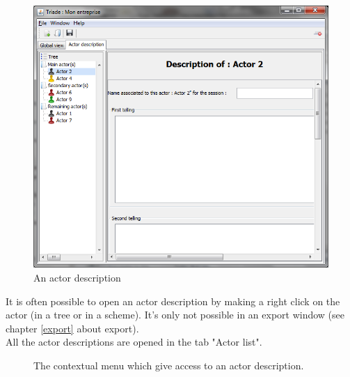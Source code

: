 \begin{figure}[h!t]
\centering

\includegraphics[width=12cm]{images/fiche_acteur.png}

\caption{An actor description}

\end{figure}
It is often possible to open an actor description by making a right click on the actor (in a tree or in a scheme). It's only not possible in an export window (see chapter \ref{export} about export).\\

All the actor descriptions are opened in the tab "Actor list".\\


\begin{figure}[h!t]
\centering
{}

\caption{The contextual menu which give access to an actor description.}

\label{menu_fiche_acteur}
\end{figure}


